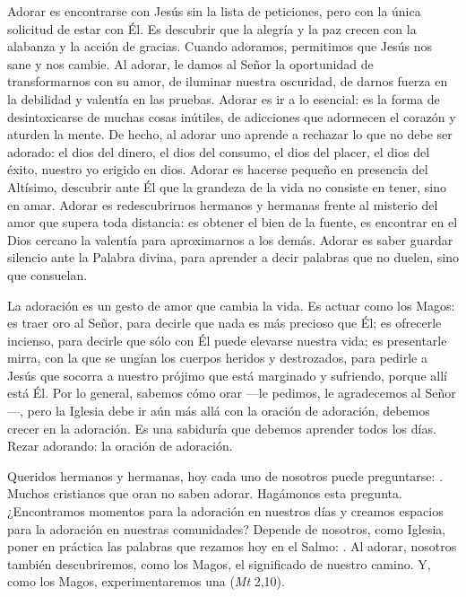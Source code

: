 \begin{body}
\begin{body}
{Adorar es encontrarse con Jesús sin la lista de peticiones, pero con la única solicitud de estar con Él. Es descubrir que la alegría y la paz crecen con la alabanza y la acción de gracias. Cuando adoramos, permitimos que Jesús nos sane y nos cambie. Al adorar, le damos al Señor la oportunidad de transformarnos con su amor, de iluminar nuestra oscuridad, de darnos fuerza en la debilidad y valentía en las pruebas. Adorar es ir a lo esencial: es la forma de desintoxicarse de muchas cosas inútiles, de adicciones que adormecen el corazón y aturden la mente. De hecho, al adorar uno aprende a rechazar lo que no debe ser adorado: el dios del dinero, el dios del consumo, el dios del placer, el dios del éxito, nuestro yo erigido en dios. Adorar es hacerse pequeño en presencia del Altísimo, descubrir ante Él que la grandeza de la vida no consiste en tener, sino en amar. Adorar es redescubrirnos hermanos y hermanas frente al misterio del amor que supera toda distancia: es obtener el bien de la fuente, es encontrar en el Dios cercano la valentía para aproximarnos a los demás. Adorar es saber guardar silencio ante la Palabra divina, para aprender a decir palabras que no duelen, sino que consuelan.

La adoración es un gesto de amor que cambia la vida. Es actuar como los Magos: es traer oro al Señor, para decirle que nada es más precioso que Él; es ofrecerle incienso, para decirle que sólo con Él puede elevarse nuestra vida; es presentarle mirra, con la que se ungían los cuerpos heridos y destrozados, para pedirle a Jesús que socorra a nuestro prójimo que está marginado y sufriendo, porque allí está Él. Por lo general, sabemos cómo orar ---le pedimos, le agradecemos al Señor---, pero la Iglesia debe ir aún más allá con la oración de adoración, debemos crecer en la adoración. Es una sabiduría que debemos aprender todos los días. Rezar adorando: la oración de adoración.

Queridos hermanos y hermanas, hoy cada uno de nosotros puede preguntarse: . Muchos cristianos que oran no saben adorar. Hagámonos esta pregunta. ¿Encontramos momentos para la adoración en nuestros días y creamos espacios para la adoración en nuestras comunidades? Depende de nosotros, como Iglesia, poner en práctica las palabras que rezamos hoy en el Salmo: . Al adorar, nosotros también descubriremos, como los Magos, el significado de nuestro camino. Y, como los Magos, experimentaremos una  (\emph{Mt} 2,10).



}
\end{body}
\end{body}
